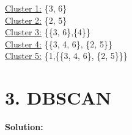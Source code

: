 \documentclass[11pt]{article}
\begin{document}
	\underline{Cluster 1:} \{3, 6\} \\
	\underline{Cluster 2:} \{2, 5\} \\
	\underline{Cluster 3:} \{\{3, 6\},\{4\}\} \\
	\underline{Cluster 4:} \{\{3, 4, 6\}, \{2, 5\}\} \\
	\underline{Cluster 5:} \{1,\{\{3, 4, 6\}, \{2, 5\}\}\}

	\section*{3. DBSCAN}

	\textbf{Solution:}\\
	\newpage
\end{document}
